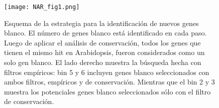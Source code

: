 \begin{figure}[htbp!] 
    \centering    
    \texttt{[image: NAR\_fig1.png]}
    \caption[Estrategia]{Esquema de la estrategia para la identificación de nuevos genes blanco.
    El número de genes blanco está identificado en cada paso. 
    Luego de aplicar el análisis de conservación, todos los genes que tienen el mismo hit en Arabidopsis, fueron considerados como un solo gen blanco. 
    El lado derecho muestra la búsqueda hecha con filtros empíricos: bin 5 y 6 incluyen genes blanco seleccionados con ambos filtros, empíricos y de conservación.
    Mientras que el bin 2 y 3 muestra los potenciales genes blanco seleccionados sólo con el filtro de conservación.}
    \label{fig:NAR_fig1}
\end{figure}



